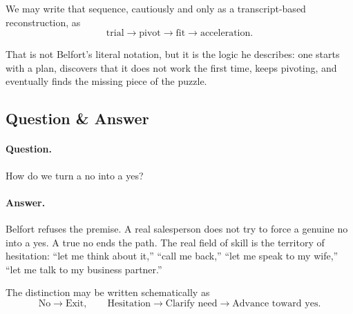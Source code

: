 We may write that sequence, cautiously and only as a transcript-based reconstruction, as
\begin{equation}
\text{trial} \longrightarrow \text{pivot} \longrightarrow \text{fit} \longrightarrow \text{acceleration}.
\end{equation}

That is not Belfort's literal notation, but it is the logic he describes: one starts with a plan, discovers that it does not work the first time, keeps pivoting, and eventually finds the missing piece of the puzzle.

\subsection{Question \& Answer}

\paragraph{Question.}
How do we turn a no into a yes?

\paragraph{Answer.}
Belfort refuses the premise. A real salesperson does not try to force a genuine no into a yes. A true no ends the path. The real field of skill is the territory of hesitation: ``let me think about it,'' ``call me back,'' ``let me speak to my wife,'' ``let me talk to my business partner.''

The distinction may be written schematically as
\begin{equation}
\text{No} \longrightarrow \text{Exit},
\qquad
\text{Hesitation} \longrightarrow \text{Clarify need} \longrightarrow \text{Advance toward yes}.
\end{equation}

\begin{figure}
\centering
{}
\end{figure}

